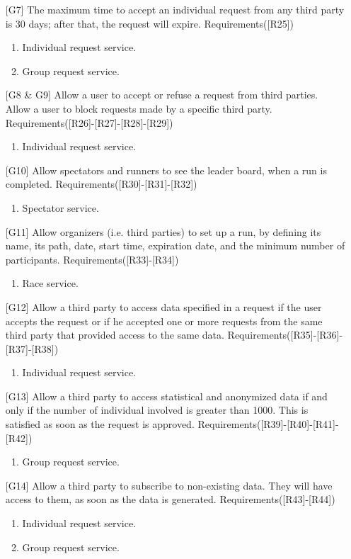 \begin{itemize}
\item[{[G7]}] The maximum time to accept an individual request from any third party is 30 days; after that, the request will expire. Requirements([R25])
	\begin{enumerate}
	\item Individual request service.
	\item Group request service.
	\end{enumerate}
\item[{[G8 \& G9]}] Allow a user to accept or refuse a request from third parties. Allow a user to block requests made by a specific third party. Requirements([R26]-[R27]-[R28]-[R29])
	\begin{enumerate}
	\item Individual request service.
	\end{enumerate}
\item[{[G10]}] Allow spectators and runners to see the leader board, when a run is completed. Requirements([R30]-[R31]-[R32])
	\begin{enumerate}
	\item Spectator service.
	\end{enumerate}
\item[{[G11]}] Allow organizers (i.e. third parties) to set up a run, by defining its name, its path, date, start time, expiration date, and the minimum number of participants. Requirements([R33]-[R34])
	\begin{enumerate}
	\item Race service.
	\end{enumerate}
\item[{[G12]}] Allow a third party to access data specified in a request if the user accepts the request or if he accepted one or more requests from the same third party that provided access to the same data. Requirements([R35]-[R36]-[R37]-[R38])
	\begin{enumerate}
	\item Individual request service.
	\end{enumerate}
\item[{[G13]}] Allow a third party to access statistical and anonymized data if and only if the number of individual involved is greater than 1000. This is satisfied as soon as the request is approved. Requirements([R39]-[R40]-[R41]-[R42])
	\begin{enumerate}
	\item Group request service.
	\end{enumerate}
\item[{[G14]}] Allow a third party to subscribe to non-existing data. They will have access to them, as soon as the data is generated. Requirements([R43]-[R44])
	\begin{enumerate}
	\item Individual request service.
	\item Group request service.
	\end{enumerate}
\end{itemize}